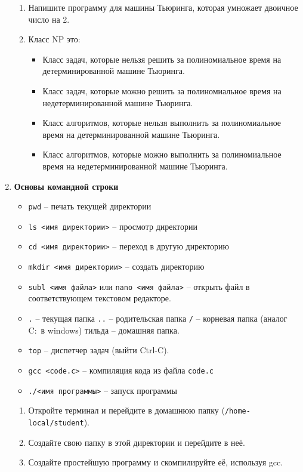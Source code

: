 \documentclass{article}
\begin{document}
\begin{enumerate}
\begin{enumerate}
\item Напишите программу для машины Тьюринга, которая умножает двоичное число на 2.


\item Класс NP это:
\begin{itemize}
\item Класс задач, которые нельзя решить за полиномиальное время на детерминированной машине Тьюринга.
\item Класс задач, которые можно решить за полиномиальное время  на недетерминированной машине Тьюринга.
\item Класс алгоритмов, которые нельзя выполнить за полиномиальное время на детерминированной машине Тьюринга.
\item Класс алгоритмов, которые можно выполнить за полиномиальное время на недетерминированной машине Тьюринга.
\end{itemize}
\end{enumerate}

\newpage

\item \textbf{Основы командной строки}
\begin{itemize}
\item \texttt{pwd} -- печать текущей директории
\item \texttt{ls <имя директории>} -- просмотр директории
\item \texttt{cd <имя директории>} -- переход в другую директорию
\item \texttt{mkdir <имя директории>} -- создать директорию
\item \texttt{subl <имя файла>} или \texttt{nano <имя файла>} -- открыть файл в соответствующем текстовом редакторе.
\item \texttt{.} -- текущая папка \quad \texttt{..} -- родительская папка \quad \texttt{/} -- корневая папка (аналог C:\ в windows) \quad тильда -- домашняя папка.
\item \texttt{top} -- диспетчер задач (выйти Ctrl-C).
\item \texttt{gcc <code.c>} -- компиляция кода из файла \texttt{code.c}
\item \texttt{./<имя программы>} -- запуск программы\\
\end{itemize}
\begin{enumerate}
\item Откройте терминал и перейдите в домашнюю папку (\texttt{/home-local/student}).
\item Создайте свою папку в этой директории и перейдите в неё.
\item Создайте простейшую программу и скомпилируйте её, используя gcc.
\end{enumerate}




\end{enumerate}
\end{document}
